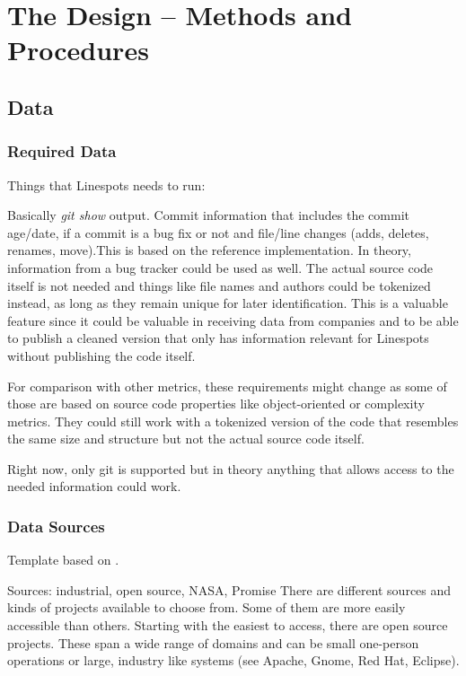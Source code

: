 \section{The Design – Methods and Procedures}

\subsection{Data} %

\subsubsection{Required Data}

Things that Linespots needs to run: %

Basically \textit{git show} output. Commit information that includes the commit age\slash date, if a commit is a bug fix or not and file\slash line changes (adds, deletes, renames, move).This is based on the reference implementation. In theory, information from a bug tracker could be used as well. The actual source code itself is not needed and things like file names and authors could be tokenized instead, as long as they remain unique for later identification. This is a valuable feature since it could be valuable in receiving data from companies and to be able to publish a cleaned version that only has information relevant for Linespots without publishing the code itself.

For comparison with other metrics, these requirements might change as some of those are based on source code properties like object-oriented or complexity metrics. They could still work with a tokenized version of the code that resembles the same size and structure but not the actual source code itself.

Right now, only git is supported but in theory anything that allows access to the needed information could work.


\subsubsection{Data Sources}

Template based on \cite{6035727}.

Sources:  industrial, open source, NASA, Promise
There are different sources and kinds of projects available to choose from.
Some of them are more easily accessible than others. Starting with the easiest to access, there are open source projects. These span a wide range of domains and can be small one-person operations or large, industry like systems (see Apache, Gnome, Red Hat, Eclipse).


